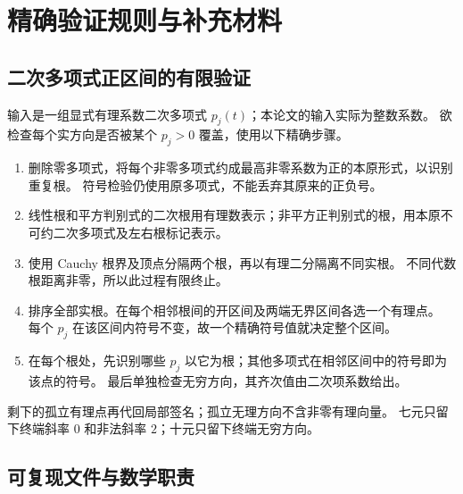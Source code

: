 \documentclass[UTF8,fontset=fandol,zihao=-4,a4paper]{ctexart}
\numberwithin{equation}{section}
\theoremstyle{definition}
\begin{document}
\section{精确验证规则与补充材料}\label{app:exact-roots}

\subsection{二次多项式正区间的有限验证}

输入是一组显式有理系数二次多项式 $p_j(t)$；本论文的输入实际为整数系数。
欲检查每个实方向是否被某个 $p_j>0$ 覆盖，使用以下精确步骤。
\begin{enumerate}
\item 删除零多项式，将每个非零多项式约成最高非零系数为正的本原形式，以识别重复根。
  符号检验仍使用原多项式，不能丢弃其原来的正负号。
\item 线性根和平方判别式的二次根用有理数表示；非平方正判别式的根，用本原不可约二次多项式及左右根标记表示。
\item 使用 Cauchy 根界及顶点分隔两个根，再以有理二分隔离不同实根。
  不同代数根距离非零，所以此过程有限终止。
\item 排序全部实根。在每个相邻根间的开区间及两端无界区间各选一个有理点。
  每个 $p_j$ 在该区间内符号不变，故一个精确符号值就决定整个区间。
\item 在每个根处，先识别哪些 $p_j$ 以它为根；其他多项式在相邻区间中的符号即为该点的符号。
  最后单独检查无穷方向，其齐次值由二次项系数给出。
\end{enumerate}
剩下的孤立有理点再代回局部签名；孤立无理方向不含非零有理向量。
七元只留下终端斜率 $0$ 和非法斜率 $2$；十元只留下终端无穷方向。

\subsection{可复现文件与数学职责}
\end{document}
